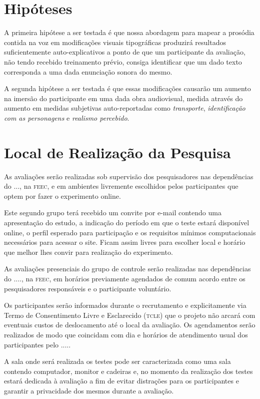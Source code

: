 \documentclass[a4paper,11pt,titlepage,singlespacing]{article}
\begin{document}
\section{Hipóteses}

\noindent A primeira hipótese a ser testada é que nossa abordagem para mapear a prosódia contida na voz em modificações visuais tipográficas produzirá resultados suficientemente auto-explicativos a ponto de que um participante da avaliação, não tendo recebido treinamento prévio, consiga identificar que um dado texto corresponda a uma dada enunciação sonora do mesmo.

A segunda hipótese a ser testada é que essas modificações causarão um aumento na imersão do participante em uma dada obra audiovisual, medida através do aumento em medidas subjetivas auto-reportadas como \textit{transporte}, \textit{identificação com as personagens} e \textit{realismo percebido}.

\section{Local de Realização da Pesquisa}

\noindent As avaliações serão realizadas sob supervisão dos pesquisadores nas dependências do ..., na \textsc{feec}, e em ambientes livremente escolhidos pelos participantes que optem por fazer o experimento online. 

Este segundo grupo terá recebido um convite por e-mail contendo uma apresentação do estudo, a indicação do período em que o teste estará disponível online, o perfil esperado para participação e os requisitos mínimos computacionais necessários para acessar o site. Ficam assim livres para escolher local e horário que melhor lhes convir para realização do experimento.

As avaliações presenciais do grupo de controle serão realizadas nas dependências do ...., na \textsc{feec}, em horários previamente agendados de comum acordo entre os pesquisadores responsáveis e o participante voluntário.

Os participantes serão informados durante o recrutamento e explicitamente via Termo de Consentimento Livre e Esclarecido (\textsc{tcle}) que o projeto não arcará com eventuais custos de deslocamento até o local da avaliação. Os agendamentos serão realizados de modo que coincidam com dia e horários de atendimento usual dos participantes pelo .....

A sala onde será realizada os testes pode ser caracterizada como uma sala contendo computador, monitor e cadeiras e, no momento da realização dos testes estará dedicada à avaliação a fim de evitar distrações para os participantes e garantir a privacidade dos mesmos durante a avaliação.
\end{document}

